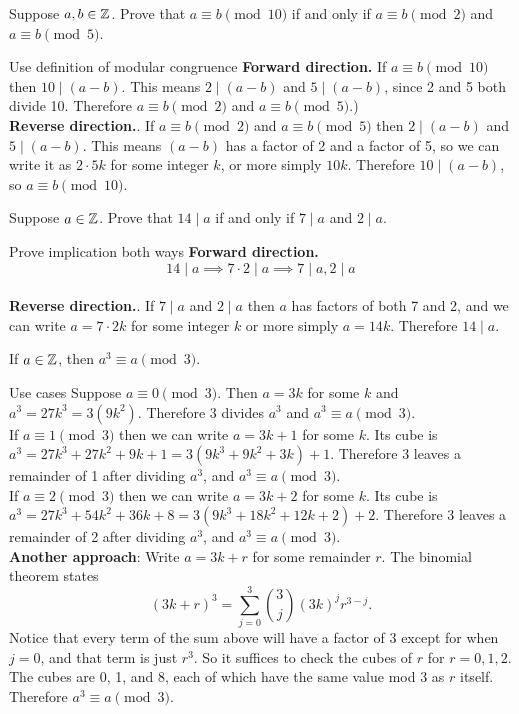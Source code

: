 \documentclass{article}
\begin{document}
\begin{problem}
Suppose $a, b \in \mathbb{Z}$. Prove that $a\equiv b \pmod{10}$ if and only if $a \equiv b \pmod{2}$ and $a \equiv b \pmod{5}$.
\end{problem}
\begin{solution}{Use definition of modular congruence}
    \textbf{Forward direction.} If $a \equiv b \pmod{10}$ then $10 \mid (a - b)$. This means $2 \mid (a - b)$ and $5 \mid (a - b)$, since 2 and 5 both divide 10. Therefore $a \equiv b \pmod{2}$ and $a \equiv b \pmod{5}$.)
    \\
    \textbf{Reverse direction.}. If $a \equiv b \pmod{2}$ and $a \equiv b \pmod{5}$ then $2 \mid (a - b)$ and $5 \mid (a - b)$. This means $(a-b)$ has a factor of 2 and a factor of 5, so we can write it as $2\cdot5k$ for some integer $k$, or more simply $10k$. Therefore $10 \mid (a - b)$, so $a \equiv b \pmod{10}$.
\end{solution}
\begin{problem}
Suppose $a \in \mathbb{Z}$. Prove that $14 \mid a$ if and only if $7 \mid a$ and $2 \mid a$.
\end{problem}
\begin{solution}{Prove implication both ways}
    \textbf{Forward direction.}
    $$ 14 \mid a \implies 7\cdot 2 \mid a \implies 7 \mid a, 2 \mid a$$
    \\
    \textbf{Reverse direction.}. If $7 \mid a$ and $2 \mid a$ then $a$ has factors of both 7 and 2, and we can write $a = 7\cdot 2k$ for some integer $k$ or more simply $a = 14k$. Therefore $14 \mid a$.
\end{solution}

\begin{problem}
If $a \in \mathbb{Z}$, then $a^3 \equiv a \pmod{3}$.
\end{problem}
\begin{solution}{Use cases}
    Suppose $a \equiv 0 \pmod{3}$. Then $a = 3k$ for some $k$ and $a^3 = 27k^3 = 3(9k^2)$. Therefore 3 divides $a^3$ and $a^3 \equiv a \pmod{3}$.
    \\
    If $a\equiv 1 \pmod{3}$ then we can write $a = 3k + 1$ for some $k$. Its cube is $a^3 = 27k^3 + 27k^2 + 9k + 1 = 3(9k^3 + 9k^2 + 3k) + 1$. Therefore 3 leaves a remainder of 1 after dividing $a^3$, and $a^3 \equiv a \pmod{3}$.
    \\
    If $a\equiv 2 \pmod{3}$ then we can write $a = 3k + 2$ for some $k$. Its cube is $a^3 = 27k^3 + 54k^2 + 36k + 8 = 3(9k^3 + 18k^2 + 12k + 2) + 2$. Therefore 3 leaves a remainder of 2 after dividing $a^3$, and $a^3 \equiv a \pmod{3}$.
    \\
    \textbf{Another approach}: Write $a = 3k + r$ for some remainder $r$. The binomial theorem states
    $$(3k + r)^3 = \sum_{j=0}^3 \binom{3}{j}(3k)^j r^{3-j}.$$
    Notice that every term of the sum above will have a factor of 3 except for when $j = 0$, and that term is just $r^3$. So it suffices to check the cubes of $r$ for $r = 0, 1, 2$. The cubes are 0, 1, and 8, each of which have the same value mod 3 as $r$ itself. Therefore $a^3 \equiv a \pmod{3}$.
\end{solution}
\end{document}
